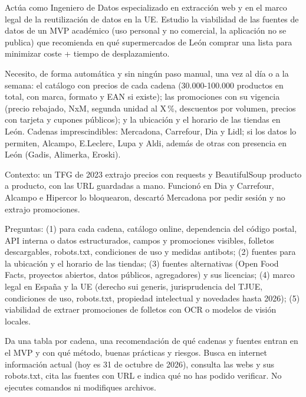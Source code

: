 \begin{tcolorbox}[colback=promptcolor, title=Prompt Introducido, colframe=blue!50!black, breakable]
	Actúa como Ingeniero de Datos especializado en extracción web y en el marco legal de la reutilización de datos en la UE. Estudio la viabilidad de las fuentes de datos de un MVP académico (uso personal y no comercial, la aplicación no se publica) que recomienda en qué supermercados de León comprar una lista para minimizar coste + tiempo de desplazamiento.

	Necesito, de forma automática y sin ningún paso manual, una vez al día o a la semana: el catálogo con precios de cada cadena (30.000-100.000 productos en total, con marca, formato y EAN si existe); las promociones con su vigencia (precio rebajado, NxM, segunda unidad al X\,\%, descuentos por volumen, precios con tarjeta y cupones públicos); y la ubicación y el horario de las tiendas en León. Cadenas imprescindibles: Mercadona, Carrefour, Dia y Lidl; si los datos lo permiten, Alcampo, E.Leclerc, Lupa y Aldi, además de otras con presencia en León (Gadis, Alimerka, Eroski).

	Contexto: un TFG de 2023 extrajo precios con requests y BeautifulSoup producto a producto, con las URL guardadas a mano. Funcionó en Dia y Carrefour, Alcampo e Hipercor lo bloquearon, descartó Mercadona por pedir sesión y no extrajo promociones.

	Preguntas: (1) para cada cadena, catálogo online, dependencia del código postal, API interna o datos estructurados, campos y promociones visibles, folletos descargables, robots.txt, condiciones de uso y medidas antibots; (2) fuentes para la ubicación y el horario de las tiendas; (3) fuentes alternativas (Open Food Facts, proyectos abiertos, datos públicos, agregadores) y sus licencias; (4) marco legal en España y la UE (derecho sui generis, jurisprudencia del TJUE, condiciones de uso, robots.txt, propiedad intelectual y novedades hasta 2026); (5) viabilidad de extraer promociones de folletos con OCR o modelos de visión locales.

	Da una tabla por cadena, una recomendación de qué cadenas y fuentes entran en el MVP y con qué método, buenas prácticas y riesgos. Busca en internet información actual (hoy es 31 de octubre de 2026), consulta las webs y sus robots.txt, cita las fuentes con URL e indica qué no has podido verificar. No ejecutes comandos ni modifiques archivos.
\end{tcolorbox}

